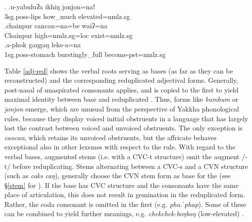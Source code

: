\ex. \ag.u-yabuluʔa ikhiŋ jonjon=naǃ\\
		{\sc 3sg.poss}-lips how\_much elevated{\sc =nmlz.sg}\\
 	\bg.chainpur cancan=na=be waiʔ=na\\
	Chainpur high{\sc =nmlz.sg=loc} exist{\sc [3sg]=nmlz.sg}		\\
		\bg.a-phok gaŋgaŋ leks-a=na\\
	{\sc 1sg.poss}-stomach burstingly\_full  become{\sc [3sg]-pst=nmlz.sg}		\\

 Table \ref{adj-red}  shows the verbal roots serving as bases (as far as they can be reconstructed) and the corresponding reduplicated adjectival forms. Generally, post-nasal  of unaspirated consonants applies, and is copied to the first  to yield maximal identity between base and reduplicated . Thus, forms like \emph{bumbum} or \emph{jonjon} emerge, which are unusual from the perspective of Yakkha phonological rules, because they display voiced initial obstruents in a language that has largely lost the contrast between voiced and unvoiced obstruents. The only exception is \emph{cancan}, which retains its unvoiced obstruents, but the affricate behaves exceptional also in other lexemes with respect to the  rule. With regard to the verbal bases, augmented stems (i.e. with a CVC-t structure) omit the augment /-t/ before reduplicating. Stems alternating between a CVC-s and a CVN structure (such as \emph{caks \ti caŋ}), generally choose the CVN stem form as base for the  (see  §\ref{stem} for ). If the base has CVC structure and the consonants have the same place of articulation, this does not result in gemination in the reduplicated form. Rather, the coda consonant is omitted in the first  (e.g. \emph{pha.ˈphap}). Some of these  can be combined to yield further meanings, e.g. \emph{chekchek-boŋboŋ} (low-elevated) . 

